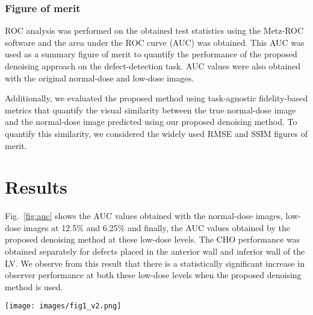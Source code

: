 \documentclass[]{spie}  %
\begin{document}
\subsubsection{Figure of merit}
ROC analysis was performed on the obtained test statistics using the Metz-ROC software \cite{metz1998maximum} and the area under the ROC curve (AUC) was obtained. This AUC was used as a summary figure of merit to quantify the performance of the proposed denoising approach on the defect-detection task. AUC values were also obtained with the original normal-dose and low-dose images.

Additionally, we evaluated the proposed method using task-agnostic fidelity-based metrics that quantify the visual similarity between the true normal-dose image and the normal-dose image predicted using our proposed denoising method. To quantify this similarity, we considered the widely used RMSE and SSIM figures of merit. 


\section{Results}
\label{sec:results}
Fig.~\ref{fig:auc} shows the AUC values obtained with the normal-dose images, low-dose images at 12.5\% and 6.25\% and finally, the AUC values obtained by the proposed denoising method at these low-dose levels. The CHO performance was obtained separately for defects placed in the anterior wall and inferior wall of the LV. We observe from this result that there is a statistically significant increase in observer performance at both these low-dose levels when the proposed denoising method is used.
\begin{figure*}[h!]
\centering
\texttt{[image: images/fig1\_v2.png]}
\caption{CHO-observer-based evaluation of different methods. The results are obtained for both anterior and inferior defects. 6.25\% and 12.5\% denote the low-dose levels. Error bar indicates 95\% confidence interval.}
\label{fig:auc}
\end{figure*}
\end{document}
